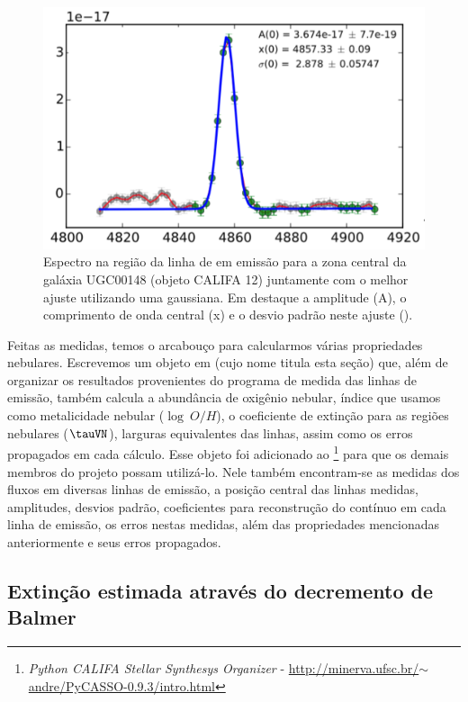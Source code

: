 \begin{figure}
	\centering
	\includegraphics[scale=0.6]{figuras/K0012-zone0-Hb.pdf}
	\caption[Exemplo de ajuste de linha de emissão]
	{Espectro na região da linha de \Hbeta em emissão para a zona central da galáxia UGC00148 (objeto
CALIFA 12) juntamente com o melhor ajuste utilizando uma gaussiana. Em destaque a amplitude (A), o
comprimento de onda central (x) e o desvio padrão neste ajuste (\sigma).}
	\label{fig:rgbline}
\end{figure}

Feitas as medidas, temos o arcabouço para calcularmos várias propriedades nebulares. Escrevemos um
objeto em \pyt (cujo nome titula esta seção) que, além de organizar os resultados provenientes do
programa de medida das linhas de emissão, também calcula a abundância de oxigênio nebular, índice
que usamos como metalicidade nebular ($\log\ O/H$), o coeficiente de extinção para as regiões
nebulares ($\tauVN$), larguras equivalentes das linhas, assim como os erros propagados em cada
cálculo. Esse objeto foi adicionado ao \pycasso\footnote{{\em Python CALIFA Stellar Synthesys
Organizer} -
\href{http://minerva.ufsc.br/~andre/PyCASSO-0.9.3/intro.html}
{http://minerva.ufsc.br/$\sim$andre/PyCASSO-0.9.3/intro.html}} \citep{CidFernandes.etal.2013a} para
que os demais membros do projeto possam utilizá-lo. Nele também encontram-se as medidas dos fluxos
em diversas linhas de emissão, a posição central das linhas medidas, amplitudes, desvios padrão,
coeficientes para reconstrução do contínuo em cada linha de emissão, os erros nestas medidas, além
das propriedades mencionadas anteriormente e seus erros propagados.

\subsection{Extinção estimada através do decremento de Balmer}
\label{sec:emline:datacube:tauvneb}

